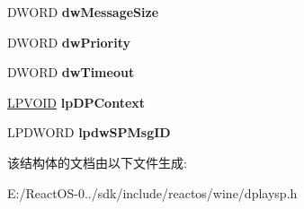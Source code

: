 \begin{DoxyCompactItemize}
\mbox{\label{structtag_d_p_s_p___s_e_n_d_t_o_g_r_o_u_p_e_x_d_a_t_a_abdfa45d67082728b197bce7760b8003c}} 
D\+W\+O\+RD {\bfseries dw\+Message\+Size}
\item 
\mbox{\label{structtag_d_p_s_p___s_e_n_d_t_o_g_r_o_u_p_e_x_d_a_t_a_a1ab0b3763c2fadb03f417ba2be534872}} 
D\+W\+O\+RD {\bfseries dw\+Priority}
\item 
\mbox{\label{structtag_d_p_s_p___s_e_n_d_t_o_g_r_o_u_p_e_x_d_a_t_a_a381923567886da7e12f97f6ed4eb6e44}} 
D\+W\+O\+RD {\bfseries dw\+Timeout}
\item 
\mbox{\label{structtag_d_p_s_p___s_e_n_d_t_o_g_r_o_u_p_e_x_d_a_t_a_ae25ab60cadaf04fa61dad09c3ba5722a}} 
\hyperlink{interfacevoid}{L\+P\+V\+O\+ID} {\bfseries lp\+D\+P\+Context}
\item 
\mbox{\label{structtag_d_p_s_p___s_e_n_d_t_o_g_r_o_u_p_e_x_d_a_t_a_ac74234a67806f7231aa7399f53b54c0b}} 
L\+P\+D\+W\+O\+RD {\bfseries lpdw\+S\+P\+Msg\+ID}
\end{DoxyCompactItemize}


该结构体的文档由以下文件生成\+:\begin{DoxyCompactItemize}
\item 
E\+:/\+React\+O\+S-\/0../sdk/include/reactos/wine/dplaysp.\+h\end{DoxyCompactItemize}
